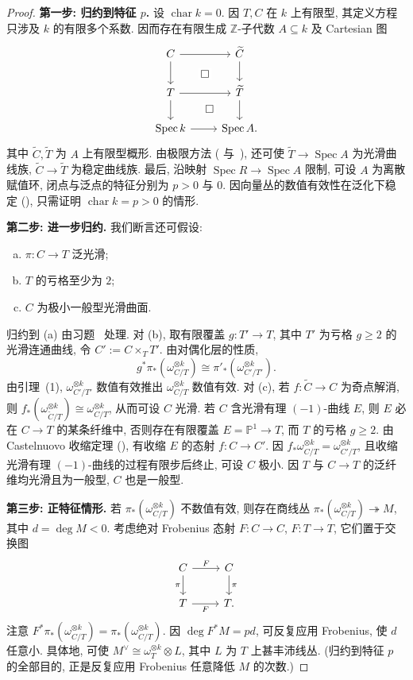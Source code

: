 \begin{proof}
\textbf{第一步: 归约到特征 $p$.} 设 $\operatorname{char}k=0$. 因 $T,\allowbreak C$ 在 $k$ 上有限型, 其定义方程只涉及 $k$ 的有限多个系数. 因而存在有限生成 $\mathbb Z$-子代数 $A\subseteq k$ 及 Cartesian 图
\[
\begin{tikzcd}
C\arrow[r]\arrow[d]&\widetilde C\arrow[d]\\
T\arrow[r]\arrow[d]\arrow[ur,phantom,"\square" description]&\widetilde T\arrow[d]\\
\operatorname{Spec}k\arrow[r]\arrow[ur,phantom,"\square" description]&\operatorname{Spec}A.
\end{tikzcd}
\]
其中 $\widetilde C,\allowbreak \widetilde T$ 为 $A$ 上有限型概形. 由极限方法 ( 与~), 还可使 $\widetilde T\to\operatorname{Spec}A$ 为光滑曲线族, $\widetilde C\to\widetilde T$ 为稳定曲线族. 最后, 沿映射 $\operatorname{Spec}R\to\operatorname{Spec}A$ 限制, 可设 $A$ 为离散赋值环, 闭点与泛点的特征分别为 $p>0$ 与 $0$. 因向量丛的数值有效性在泛化下稳定 (), 只需证明 $\operatorname{char}k=p>0$ 的情形.

\textbf{第二步: 进一步归约.} 我们断言还可假设:
\begin{enumerate}[(a)]
\item $\pi:C\to\allowbreak T$ 泛光滑;
\item $T$ 的亏格至少为 $2$;
\item $C$ 为极小一般型光滑曲面.
\end{enumerate}
归约到 (a) 由习题~ 处理. 对 (b), 取有限覆盖 $g:T'\to\allowbreak T$, 其中 $T'$ 为亏格 $g\geq2$ 的光滑连通曲线, 令 $C':=C\times_TT'$. 由对偶化层的性质,
\[
g^*\pi_*(\omega_{C/T}^{\otimes k})\cong\pi'_*(\omega_{C'/T'}^{\otimes k}).
\]
由引理~(1), $\omega_{C'/T'}^{\otimes k}$ 数值有效推出 $\omega_{C/T}^{\otimes k}$ 数值有效. 对 (c), 若 $f:\widetilde C\to\allowbreak C$ 为奇点解消, 则 $f_*(\omega_{\widetilde C/T}^{\otimes k})\cong\omega_{C/T}^{\otimes k}$, 从而可设 $C$ 光滑. 若 $C$ 含光滑有理 $(-1)$-曲线 $E$, 则 $E$ 必在 $C\to\allowbreak T$ 的某条纤维中, 否则存在有限覆盖 $E=\mathbb P^1\to\allowbreak T$, 而 $T$ 的亏格 $g\geq2$. 由 Castelnuovo 收缩定理 (), 有收缩 $E$ 的态射 $f:C\to\allowbreak C'$. 因 $f_*\omega_{C/T}^{\otimes k}=\omega_{C'/T}^{\otimes k}$, 且收缩光滑有理 $(-1)$-曲线的过程有限步后终止, 可设 $C$ 极小. 因 $T$ 与 $C\to\allowbreak T$ 的泛纤维均光滑且为一般型, $C$ 也是一般型.

\textbf{第三步: 正特征情形.} 若 $\pi_*(\omega_{C/T}^{\otimes k})$ 不数值有效, 则存在商线丛 $\pi_*(\omega_{C/T}^{\otimes k})\twoheadrightarrow M$, 其中 $d=\deg M<0$. 考虑绝对 Frobenius 态射 $F:C\to\allowbreak C$, $F:T\to\allowbreak T$, 它们置于交换图
\[
\begin{tikzcd}
C\arrow[r,"F"]\arrow[d,"\pi"']&C\arrow[d,"\pi"]\\
T\arrow[r,"F"']&T.
\end{tikzcd}
\]
注意 $F^*\pi_*(\omega_{C/T}^{\otimes k})=\pi_*(\omega_{C/T}^{\otimes k})$. 因 $\deg F^*M=pd$, 可反复应用 Frobenius, 使 $d$ 任意小. 具体地, 可使 $M^\vee\cong\omega_T^{\otimes k}\otimes L$, 其中 $L$ 为 $T$ 上甚丰沛线丛. (归约到特征 $p$ 的全部目的, 正是反复应用 Frobenius 任意降低 $M$ 的次数.)


\end{proof}
